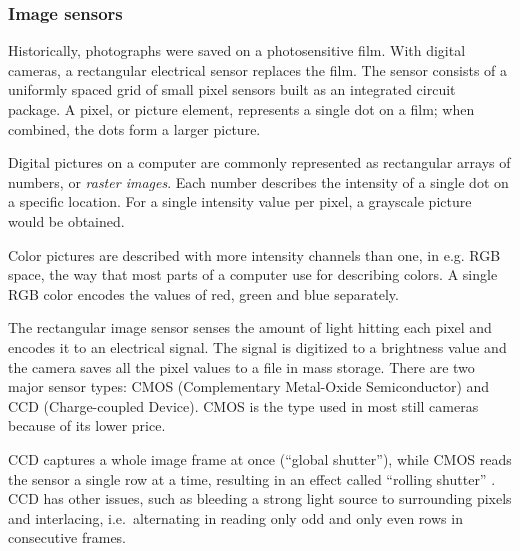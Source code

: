 


\subsubsection{Image sensors} %


Historically, photographs were saved on a photosensitive film.
With digital cameras, a rectangular electrical sensor replaces the film.
The sensor consists of a uniformly spaced grid of small pixel sensors built as an integrated circuit package.
A pixel, or picture element, represents a single dot on a film; when combined, the dots form a larger picture.


Digital pictures on a computer are commonly represented as rectangular arrays of numbers, or \emph{raster images}.
Each number describes the intensity of a single dot on a specific location.
For a single intensity value per pixel, a grayscale picture would be obtained.

Color pictures are described with more intensity channels than one, in e.g. RGB space, the way that most parts of a computer use for describing colors.
A single RGB color encodes the values of red, green and blue separately.


The rectangular image sensor senses the amount of light hitting each pixel and encodes it to an electrical signal.
The signal is digitized to a brightness value and the camera saves all the pixel values to a file in mass storage.
There are two major sensor types: CMOS (Complementary Metal-Oxide Semiconductor) and CCD (Charge-coupled Device).
CMOS is the type used in most still cameras because of its lower price.

CCD captures a whole image frame at once (``global shutter''), while CMOS reads the sensor a single row at a time, resulting in an effect called ``rolling shutter'' \cite{todo:cmos}.
CCD has other issues, such as bleeding a strong light source to surrounding pixels and interlacing, i.e.~alternating in reading only odd and only even rows in consecutive frames.

